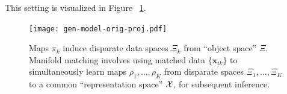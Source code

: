 \documentclass[12pt,oneside,final]{thesis}
\begin{document}
 This setting is visualized in  Figure ~\ref{fig:multisensor}.

\begin{figure}
  \begin{center}
\texttt{[image: gen-model-orig-proj.pdf]}
 \caption{Maps $\pi_k$ induce disparate data spaces $\Xi_k$ from ``object space'' $\Xi$.
    Manifold matching involves using matched data $\{\bm{x}_{ik}\}$
    to simultaneously learn maps $\rho_1,\ldots,\rho_K$
    from disparate spaces 
    $\Xi_1,\ldots,\Xi_K$
  to a common ``representation space'' $\mathcal{X}$, for subsequent inference.\label{fig:multisensor}}
  \end{center}
  
\end{figure}

\end{document}
